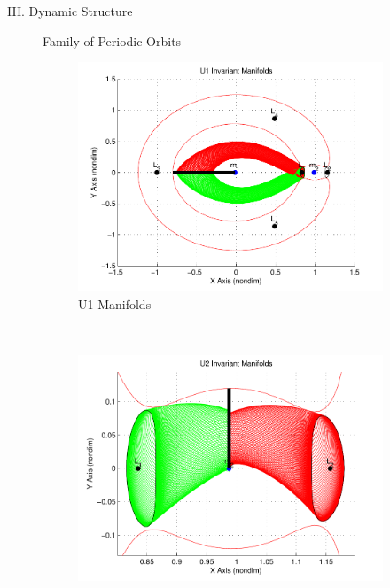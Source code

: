 \documentclass[final, usenames, dvipsnames]{beamer}
\newlength{\twocolwidth}
\begin{document}
\begin{frame}[t]
\begin{columns}[T,onlytextwidth]
\begin{column}{\twocolwidth}
\begin{block}{III. Dynamic Structure}
\begin{minipage}{0.5\columnwidth}
\begin{figure}
			\caption*{Family of Periodic Orbits\label{fig:periodic_family}}
		\end{figure}
	\end{minipage}%
	\begin{figure}
        \centering
        \begin{subfigure}[b]{0.24\columnwidth}
                \includegraphics[width=\columnwidth]{U1_Manifolds}
                \caption*{U1 Manifolds}
                \label{fig:u1_manifolds}
        \end{subfigure}%
        ~%
        \begin{subfigure}[b]{0.24\columnwidth}
                \includegraphics[width=\columnwidth]{U2_Manifolds}

\end{subfigure}
\end{figure}
\end{block}
\end{column}
\end{columns}
\end{frame}
\end{document}

